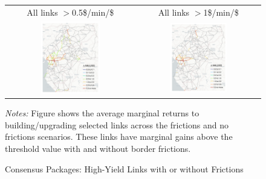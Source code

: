 \documentclass[a4paper]{article}
\begin{document}
\begin{figure}[H] \vspace{-1mm}
\centering
\caption{\label{fig:UG_cons} Consensus Packages: High-Yield Links with or without Frictions}
\vspace{2mm}
\begin{tabular}{cc}
All links $>$0.5\$/min/\$ & All links $>$1\$/min/\$ \\
\includegraphics[width=0.48\textwidth]{"../figures/PE/trans_CEMAC_network_MA_gain_all_100kmh_pusd_cons_MAg0.5_google.pdf"} &
\includegraphics[width=0.48\textwidth]{"../figures/PE/trans_CEMAC_network_MA_gain_all_100kmh_pusd_cons_MAg1_google.pdf"} 
\end{tabular}
\scriptsize 
\emph{Notes:} Figure shows the average marginal returns to building/upgrading selected links across the frictions and no frictions scenarios. These links have marginal gains above the threshold value with and without border frictions.  
\end{figure}
\end{document}

